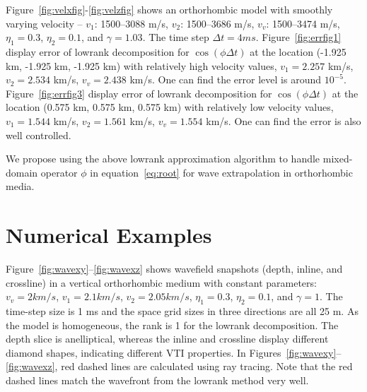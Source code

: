 Figure~\ref{fig:velxfig}-\ref{fig:velzfig} shows an orthorhombic model with smoothly varying velocity -- 
$v_1$: 1500--3088 m/s, $v_2$: 1500--3686 m/s, $v_v$: 1500--3474 m/s, $\eta_1=0.3$, $\eta_2=0.1$, and $\gamma=1.03$.
The time step $\Delta t=4 ms$.
Figure~\ref{fig:errfig1} display error of lowrank decomposition for $\cos(\phi \Delta t)$ at the location (-1.925 km, -1.925 km, -1.925 km) with relatively high velocity values, $v_1=2.257$ km/s,  $v_2=2.534$ km/s, $v_v=2.438$ km/s. 
One can find the error level is around $10^{-5}$.
Figure~\ref{fig:errfig3} display error of lowrank decomposition for $\cos(\phi \Delta t)$ at the location (0.575 km, 0.575 km, 0.575 km) with relatively low velocity values, $v_1=1.544$ km/s,  $v_2=1.561$ km/s, $v_v=1.554$ km/s. 
One can find the error is also well controlled.

We propose using the above lowrank approximation algorithm to handle mixed-domain operator
$\phi$ in equation~\ref{eq:root} for wave extrapolation in orthorhombic media.\\



\section{Numerical Examples}


Figure~\ref{fig:wavexy}--\ref{fig:wavexz} shows wavefield snapshots (depth, inline, and crossline) in a vertical orthorhombic medium with constant parameters: $v_v=2 km/s$, $v_1=2.1 km/s$, $v_2=2.05 km/s$, $\eta_1=0.3$, $\eta_2=0.1$, and $\gamma=1$.
The time-step size is 1 ms and the space grid sizes in three directions are all 25 m.
As the model is homogeneous, the rank is 1 for the lowrank decomposition.
The depth slice is anelliptical, whereas the inline and crossline display different diamond shapes, indicating different VTI properties.   
In Figures~\ref{fig:wavexy}--\ref{fig:wavexz}, red dashed lines are calculated using ray tracing. 
Note that the red dashed lines match the wavefront from the lowrank method very well.\\ 

